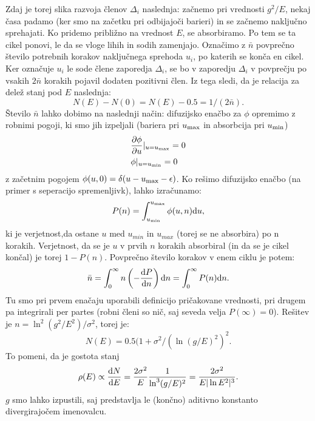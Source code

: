 \begin{appendices}
Zdaj je torej slika razvoja členov $\Delta_i$ naslednja: začnemo pri vrednosti $g^2/E$, nekaj časa padamo (ker smo na začetku pri odbijajoči barieri) in se začnemo naključno sprehajati.
Ko pridemo približno na vrednost $E$, se absorbiramo. Po tem se ta cikel ponovi, le da se vloge lihih in sodih zamenjajo.
Označimo z $\bar{n}$ povprečno število potrebnih korakov naključnega sprehoda $u_i$, po katerih se konča en cikel. Ker označuje $u_i$ le sode člene zaporedja $\Delta_i$, se bo v zaporedju $\Delta_i$ v povprečju po vsakih $2 \bar{n}$ korakih pojavil dodaten pozitivni člen. Iz tega sledi, da je relacija za delež stanj pod $E$ naslednja:
\begin{equation}
N(E) - N(0) = N(E) - 0.5 = 1/(2\bar{n}).
\end{equation}
Število $\bar{n}$ lahko dobimo na naslednji način:
difuzijsko enačbo za $\phi$ opremimo z robnimi pogoji, ki smo jih izpeljali (bariera pri $u_{\textup{max}}$ in absorbcija pri $u_{\textup{min}}$)
\begin{align}
& \frac{\partial \phi}{\partial u} \vert_{u = u_{\textup{max}}} = 0 \\
& \phi \vert_{u = u_{\textup{min}}} = 0
\end{align}
z začetnim pogojem $\phi (u, 0) = \delta ( u - u_{\textup{max}} - \epsilon)$.
Ko rešimo difuzijsko enačbo (na primer s seperacijo spremenljivk), lahko izračunamo:
\begin{equation}
P(n) = \int_{u_{\textup{min}}}^{u_{\textup{max}}} \phi(u,n) \textup{d} u,
\end{equation}
ki je verjetnost,da ostane $u$ med $u_{min}$ in $u_{max}$ (torej se ne absorbira) po n korakih. Verjetnost, da se je $u$ v prvih $n$ korakih absorbiral (in da se je cikel končal) je torej $1-P(n)$.  
Povprečno število korakov v enem ciklu je potem:
\begin{equation}
\bar{n} = \int_0^\infty n \left( - \frac{ \textup{d} P}{\textup{d} n} \right) \textup{d} n = \int_0^\infty P(n) \textup{d} n.
\end{equation}
Tu smo pri prvem enačaju uporabili definicijo pričakovane vrednosti, pri drugem pa integrirali per partes (robni členi so nič, saj seveda velja $P(\infty) = 0$).
Rešitev je $n =  \ln^2(g^2/E^2) / \sigma^2$, torej je:
\begin{equation}
N(E) = 0.5 (1 + \sigma^2 / (\ln (g/E)^2)^2.
\end{equation}
To pomeni, da je gostota stanj
\begin{equation}
\rho(E) \propto \frac{\textup{d} N}{\textup{d} E} = \frac{2 \sigma^2}{E} \frac{1}{\ln^3 (g/E)^2} = \frac{2 \sigma^2}{E |\ln E^2|^3}.
\end{equation}
$g$ smo lahko izpustili, saj predstavlja le (končno) aditivno konstanto divergirajočem imenovalcu.


\end{appendices}
